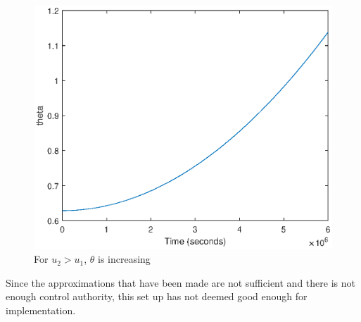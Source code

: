 %
\begin{figure}[H]
	\centering
	\includegraphics[width=0.6\linewidth]
	{figures/nontheta.eps}
	\caption{For $u_2 >u_1$, $\theta$ is increasing }
	\label{fig:intheta}
\end{figure}
%
 Since the approximations that have been made are not sufficient and there is not enough control authority, this set up has not deemed good enough for implementation. 
